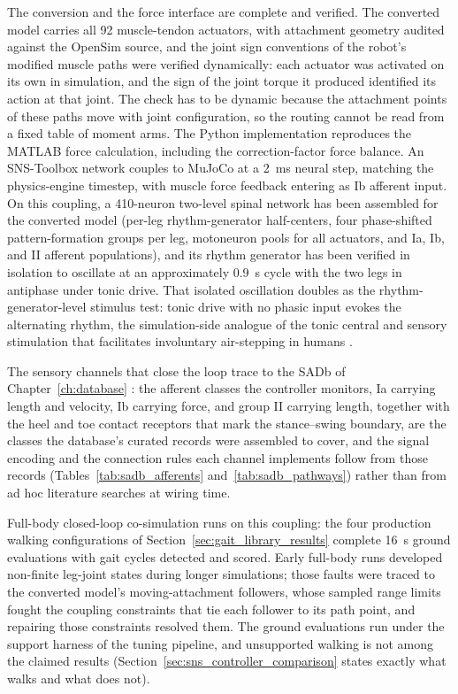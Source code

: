 The conversion and the force interface are complete and verified. The converted model carries all 92 muscle-tendon actuators, with attachment geometry audited against the OpenSim source, and the joint sign conventions of the robot's modified muscle paths were verified dynamically: each actuator was activated on its own in simulation, and the sign of the joint torque it produced identified its action at that joint. The check has to be dynamic because the attachment points of these paths move with joint configuration, so the routing cannot be read from a fixed table of moment arms. The Python implementation reproduces the MATLAB force calculation, including the correction-factor force balance. An SNS-Toolbox network couples to MuJoCo at a \qty{2}{\milli\second} neural step, matching the physics-engine timestep, with muscle force feedback entering as Ib afferent input. On this coupling, a 410-neuron two-level spinal network has been assembled for the converted model (per-leg rhythm-generator half-centers, four phase-shifted pattern-formation groups per leg, motoneuron pools for all actuators, and Ia, Ib, and II afferent populations), and its rhythm generator has been verified in isolation to oscillate at an approximately \qty{0.9}{\second} cycle with the two legs in antiphase under tonic drive. That isolated oscillation doubles as the rhythm-generator-level stimulus test: tonic drive with no phasic input evokes the alternating rhythm, the simulation-side analogue of the tonic central and sensory stimulation that facilitates involuntary air-stepping in humans \citep{selionov_tonic_2009}.

The sensory channels that close the loop trace to the SADb of Chapter~\ref{ch:database} \citep{bolen_sensory_2023}: the afferent classes the controller monitors, Ia carrying length and velocity, Ib carrying force, and group II carrying length, together with the heel and toe contact receptors that mark the stance--swing boundary, are the classes the database's curated records were assembled to cover, and the signal encoding and the connection rules each channel implements follow from those records (Tables~\ref{tab:sadb_afferents} and~\ref{tab:sadb_pathways}) rather than from ad hoc literature searches at wiring time.

Full-body closed-loop co-simulation runs on this coupling: the four production walking configurations of Section~\ref{sec:gait_library_results} complete \qty{16}{\second} ground evaluations with gait cycles detected and scored. Early full-body runs developed non-finite leg-joint states during longer simulations; those faults were traced to the converted model's moving-attachment followers, whose sampled range limits fought the coupling constraints that tie each follower to its path point, and repairing those constraints resolved them. The ground evaluations run under the support harness of the tuning pipeline, and unsupported walking is not among the claimed results (Section~\ref{sec:sns_controller_comparison} states exactly what walks and what does not).

